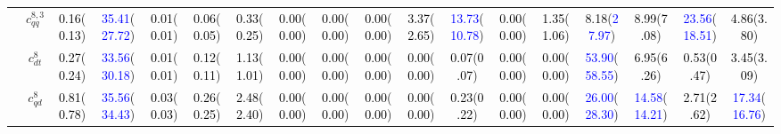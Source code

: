 \documentclass{article}
\begin{document}
\begin{landscape}
\begin{table}[H]
\begin{tabular}{|c|c|c|c|c|c|c|c|c|c|c|c|c|c|c|c|c|c|}
 & $c_{qq}^{8,3}$ & \textcolor{black}{0.16}(\textcolor{black}{0.13}) & \textcolor{blue}{35.41}(\textcolor{blue}{27.72}) & \textcolor{black}{0.01}(\textcolor{black}{0.01}) & \textcolor{black}{0.06}(\textcolor{black}{0.05}) & \textcolor{black}{0.33}(\textcolor{black}{0.25}) & \textcolor{black}{0.00}(\textcolor{black}{0.00}) & \textcolor{black}{0.00}(\textcolor{black}{0.00}) & \textcolor{black}{0.00}(\textcolor{black}{0.00}) & \textcolor{black}{3.37}(\textcolor{black}{2.65}) & \textcolor{blue}{13.73}(\textcolor{blue}{10.78}) & \textcolor{black}{0.00}(\textcolor{black}{0.00}) & \textcolor{black}{1.35}(\textcolor{black}{1.06}) & \textcolor{black}{8.18}(\textcolor{blue}{27.97}) & \textcolor{black}{8.99}(\textcolor{black}{7.08}) & \textcolor{blue}{23.56}(\textcolor{blue}{18.51}) & \textcolor{black}{4.86}(\textcolor{black}{3.80})\\ \cline{2-18}
 & $c_{dt}^{8}$ & \textcolor{black}{0.27}(\textcolor{black}{0.24}) & \textcolor{blue}{33.56}(\textcolor{blue}{30.18}) & \textcolor{black}{0.01}(\textcolor{black}{0.01}) & \textcolor{black}{0.12}(\textcolor{black}{0.11}) & \textcolor{black}{1.13}(\textcolor{black}{1.01}) & \textcolor{black}{0.00}(\textcolor{black}{0.00}) & \textcolor{black}{0.00}(\textcolor{black}{0.00}) & \textcolor{black}{0.00}(\textcolor{black}{0.00}) & \textcolor{black}{0.00}(\textcolor{black}{0.00}) & \textcolor{black}{0.07}(\textcolor{black}{0.07}) & \textcolor{black}{0.00}(\textcolor{black}{0.00}) & \textcolor{black}{0.00}(\textcolor{black}{0.00}) & \textcolor{blue}{53.90}(\textcolor{blue}{58.55}) & \textcolor{black}{6.95}(\textcolor{black}{6.26}) & \textcolor{black}{0.53}(\textcolor{black}{0.47}) & \textcolor{black}{3.45}(\textcolor{black}{3.09})\\ \cline{2-18}
 & $c_{qd}^{8}$ & \textcolor{black}{0.81}(\textcolor{black}{0.78}) & \textcolor{blue}{35.56}(\textcolor{blue}{34.43}) & \textcolor{black}{0.03}(\textcolor{black}{0.03}) & \textcolor{black}{0.26}(\textcolor{black}{0.25}) & \textcolor{black}{2.48}(\textcolor{black}{2.40}) & \textcolor{black}{0.00}(\textcolor{black}{0.00}) & \textcolor{black}{0.00}(\textcolor{black}{0.00}) & \textcolor{black}{0.00}(\textcolor{black}{0.00}) & \textcolor{black}{0.00}(\textcolor{black}{0.00}) & \textcolor{black}{0.23}(\textcolor{black}{0.22}) & \textcolor{black}{0.00}(\textcolor{black}{0.00}) & \textcolor{black}{0.00}(\textcolor{black}{0.00}) & \textcolor{blue}{26.00}(\textcolor{blue}{28.30}) & \textcolor{blue}{14.58}(\textcolor{blue}{14.21}) & \textcolor{black}{2.71}(\textcolor{black}{2.62}) & \textcolor{blue}{17.34}(\textcolor{blue}{16.76})\\ \cline{2-18}

\end{tabular}
\end{table}
\end{landscape}
\end{document}
